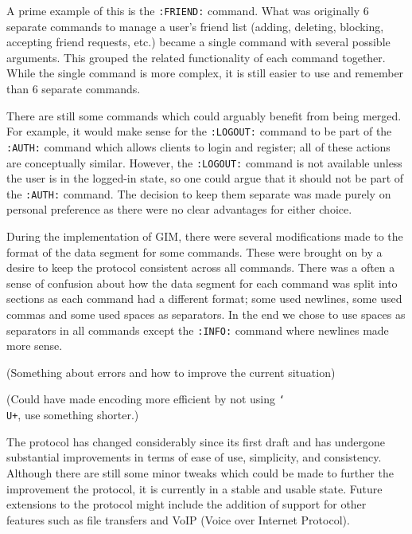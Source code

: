 A prime example of this is the \texttt{:FRIEND:} command. What was originally 6 separate commands to manage a user's friend list (adding, deleting, blocking, accepting friend requests, etc.) became a single command with several possible arguments. This grouped the related functionality of each command together. While the single command is more complex, it is still easier to use and remember than 6 separate commands.

There are still some commands which could arguably benefit from being merged. For example, it would make sense for the \texttt{:LOGOUT:} command to be part of the \texttt{:AUTH:} command which allows clients to login and register; all of these actions are conceptually similar. However, the \texttt{:LOGOUT:} command is not available unless the user is in the logged-in state, so one could argue that it should not be part of the \texttt{:AUTH:} command. The decision to keep them separate was made purely on personal preference as there were no clear advantages for either choice. 

During the implementation of GIM, there were several modifications made to the format of the data segment for some commands. These were brought on by a desire to keep the protocol consistent across all commands. There was a often a sense of confusion about how the data segment for each command was split into sections as each command had a different format; some used newlines, some used commas and some used spaces as separators. In the end we chose to use spaces as separators in all commands except the \texttt{:INFO:} command where newlines made more sense. 

(Something about errors and how to improve the current situation)

(Could have made encoding more efficient by not using \texttt{\char`\\ U+}, use something shorter.)

The protocol has changed considerably since its first draft and has undergone substantial improvements in terms of ease of use, simplicity, and consistency. Although there are still some minor tweaks which could be made to further the improvement the protocol, it is currently in a stable and usable state. Future extensions to the protocol might include the addition of support for other features such as file transfers and VoIP (Voice over Internet Protocol).
